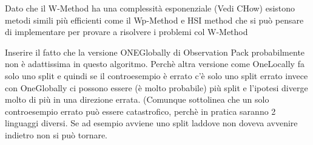 Dato che il W-Method ha una complessità esponenziale (Vedi CHow) esistono metodi simili più efficienti come il Wp-Method e HSI method che si può pensare di implementare per provare a risolvere i problemi col W-Method

Inserire il fatto che la versione ONEGlobally di Observation Pack probabilmente non è adattissima in questo algoritmo. Perchè altra versione come OneLocally fa solo uno split e quindi se il controesempio è errato c'è solo uno split errato invece con OneGlobally ci possono essere (è molto probabile) più split e l'ipotesi diverge molto di più in una direzione errata. (Comunque sottolinea che un solo controesempio errato può essere catastrofico, perchè in pratica saranno 2 linguaggi diversi. Se ad esempio avviene uno split laddove non doveva avvenire indietro non si può tornare.

